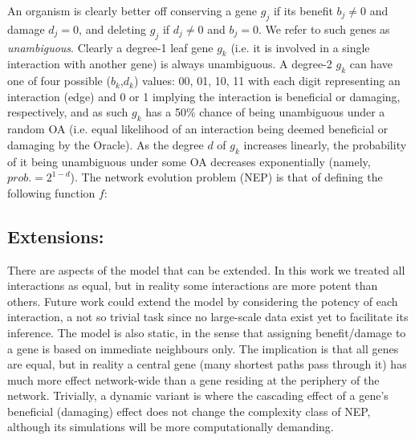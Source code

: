 		An organism is clearly better off conserving a gene $g_j$ if its benefit $b_j\neq 0$  and damage $d_j=0$, and deleting $g_j$ if $d_j\neq 0$ and $b_j=0$. We refer to such genes as \textit{unambiguous}. Clearly a degree-1 leaf gene $g_k$ (i.e. it is involved in a single interaction with another gene) is always unambiguous. A degree-2 $g_k$ can have one of four possible ($b_k$,$d_k$) values: 00, 01, 10, 11 with each digit representing an interaction (edge) and 0 or 1 implying the interaction is beneficial or damaging, respectively, and as such $g_k$ has a 50\% chance of being unambiguous under a random OA (i.e. equal likelihood of an interaction being deemed beneficial or damaging by the Oracle). As the degree $d$ of $g_k$ increases linearly, the probability of it being unambiguous under some OA decreases exponentially (namely,  $prob. = 2^{1-d}$). The network evolution problem (NEP) is that of defining the following function $f$:


        \subsection{Extensions:}
		There are aspects of the model that can be extended. In this work we treated all interactions as equal, but in reality some interactions are more potent than others. Future work could extend the model by considering the potency of each interaction, a not so trivial task since no large-scale data exist yet to facilitate its inference. The model is also static, in the sense that assigning benefit/damage to a gene is based on immediate neighbours only. The implication is that all genes are equal, but in reality a central gene (many shortest paths pass through it) has much more effect network-wide than a gene residing at the periphery of the network. Trivially, a dynamic variant is where the cascading effect of a gene's beneficial (damaging) effect does not change the complexity class of NEP, although its simulations will be more computationally demanding.

\clearpage %
\printbibliography

